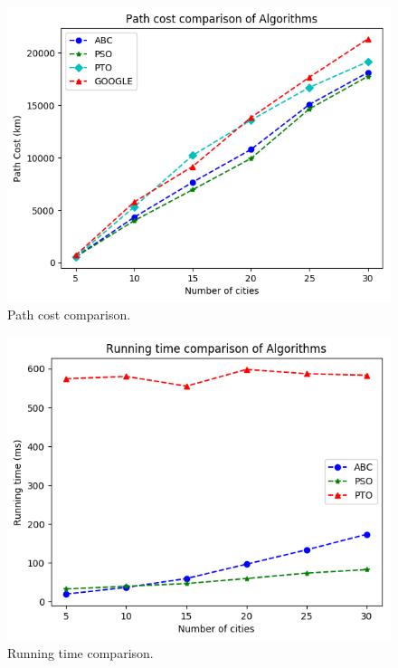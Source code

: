 \documentclass[conference]{IEEEtran}
\begin{document}
\begin{figure}[htbp]
\centerline{\includegraphics[width=\columnwidth]{pathcost.png}}
\caption{Path cost comparison.}
\label{fig1}
\end{figure}

\begin{figure}[htbp]
\centerline{\includegraphics[width=\columnwidth]{runtime.png}}
\caption{Running time comparison.}
\label{fig2}
\end{figure}
\end{document}
